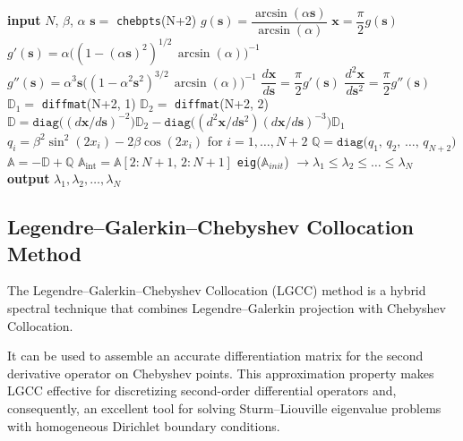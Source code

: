 \documentclass[11pt,a4paper,oneside,openright]{report} %
\begin{document}
\begin{algorithm}[H]
\caption{Mapped Barycentric Chebyshev Differentiation Matrix - Coffey--Evans equation}
\label{alg_MBCDM_CE}
{\small
\begin{algorithmic}[1]
\State \textbf{input} $N$, $\beta$, $\alpha$
\State $\boldsymbol{s} =$ \texttt{chebpts}(N+2)
\State $g(\boldsymbol{s}) = \dfrac{\arcsin(\alpha \boldsymbol{s})}{\arcsin(\alpha)}$ 
\State $\boldsymbol{x} = \dfrac{\pi}{2} g(\boldsymbol{s})$
\BlankLine
\State $g'(\boldsymbol{s}) = \alpha \big((1-(\alpha \boldsymbol{s})^2)^{1/2} \, \arcsin(\alpha) \big)^{-1}$
\State $g''(\boldsymbol{s}) = \alpha^3 \boldsymbol{s} \big((1-\alpha^2 \boldsymbol{s}^2)^{3/2} \, \arcsin(\alpha) \big)^{-1}$
\BlankLine
\State $\dfrac{d\boldsymbol{x}}{d\boldsymbol{s}} = \dfrac{\pi}{2} g'(\boldsymbol{s})$
\State $\dfrac{d^2 \boldsymbol{x}}{d\boldsymbol{s}^2} = \dfrac{\pi}{2} g''(\boldsymbol{s})$
\BlankLine
\State $\mathbb{D}_1 =$ \texttt{diffmat}(N+2, 1)
\State $\mathbb{D}_2 = $ \texttt{diffmat}(N+2, 2) 
\BlankLine
\State $\mathbb{D} = \texttt{diag}\big((d\boldsymbol{x}/d\boldsymbol{s})^{-2}\big) \mathbb{D}_2 - \texttt{diag}\big((d^2\boldsymbol{x}/d\boldsymbol{s}^2)(d\boldsymbol{x}/d\boldsymbol{s})^{-3}\big) \mathbb{D}_1$
\State $q_i =  \beta^2 \sin^2(2 x_i) - 2 \beta \cos(2x_i) $ \quad for $i=1, \dots,N+2$
\State $\mathbb{Q} = \texttt{diag}\big(q_1, \, q_2, \, \dots, \, q_{N+2}\big)$
\State $\mathbb{A} = -\mathbb{D} + \mathbb{Q}$
\State $\mathbb{A}_{\text{int}} = \mathbb{A}[2:N+1, \, 2:N+1]$
\BlankLine
\State \texttt{eig}($\mathbb{A}_{init}$) $ \to \lambda_1 \leq \lambda_2 \leq \dots \leq \lambda_N$
\State \textbf{output} $\lambda_1, \lambda_2, \dots, \lambda_N$
\end{algorithmic}
}
\end{algorithm}



\subsection{Legendre--Galerkin--Chebyshev Collocation Method}
\noindent
The Legendre--Galerkin--Chebyshev Collocation (LGCC) method is a hybrid spectral technique that combines Legendre--Galerkin projection with Chebyshev Collocation.

It can be used to assemble an accurate differentiation matrix for the second derivative operator on Chebyshev points. This approximation property makes LGCC effective for discretizing second-order differential operators and, consequently, an excellent tool for solving Sturm--Liouville eigenvalue problems with homogeneous Dirichlet boundary conditions.
\end{document}

